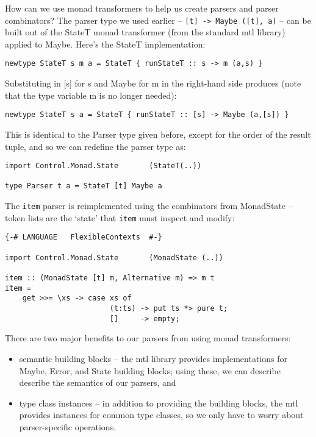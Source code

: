 \documentclass{tmr}
\begin{document}
How can we use monad transformers to help us create parsers and parser combinators?
The parser type we used earlier -- \verb+[t] -> Maybe ([t], a)+
-- can be built out of the StateT monad transformer (from the standard 
mtl \cite{mtl} library) applied to Maybe.  Here's the StateT implementation:
\begin{verbatim}
newtype StateT s m a = StateT { runStateT :: s -> m (a,s) }
\end{verbatim}

Substituting in [s] for s and Maybe for m in the right-hand side produces
(note that the type variable m is no longer needed):
\begin{verbatim}
newtype StateT s a = StateT { runStateT :: [s] -> Maybe (a,[s]) }
\end{verbatim}

This is identical to the Parser type given before, except for the order 
of the result tuple, and so we can redefine the parser type as:
\begin{verbatim}
import Control.Monad.State       (StateT(..))

type Parser t a = StateT [t] Maybe a
\end{verbatim}

The \verb+item+ parser is reimplemented using the combinators from MonadState --
token lists are the `state' that \verb+item+ must inspect and modify:
\begin{verbatim}
{-# LANGUAGE   FlexibleContexts  #-}

import Control.Monad.State       (MonadState (..))

item :: (MonadState [t] m, Alternative m) => m t
item =
    get >>= \xs -> case xs of
                        (t:ts) -> put ts *> pure t;
                        []     -> empty;
\end{verbatim}

There are two major benefits to our parsers from using monad transformers:
\begin{itemize}
 \item semantic building blocks -- the mtl library provides implementations
    for Maybe, Error, and State building blocks; using these, we can describe
    describe the semantics of our parsers, and
 \item type class instances -- in addition to providing the building blocks,
    the mtl provides instances for common type classes, so we only have to 
    worry about parser-specific operations.
\end{itemize}
\end{document}
